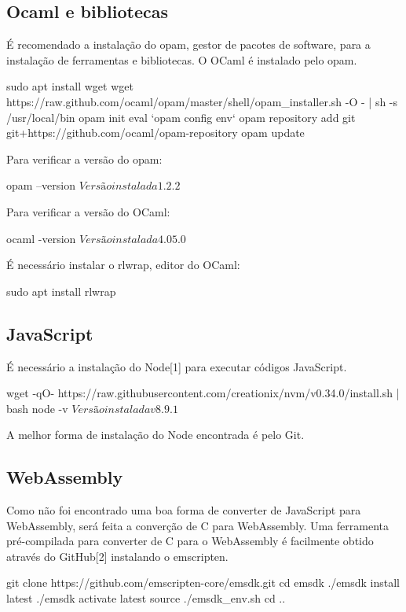 \documentclass[12pt,a4paper,twoside]{article}
\begin{document}
\subsection{Ocaml e bibliotecas}
É recomendado a instalação do opam, gestor de pacotes de software, para a instalação de ferramentas e bibliotecas. O OCaml é instalado pelo opam.
\begin{terminal}
  sudo apt install wget
  wget https://raw.github.com/ocaml/opam/master/shell/opam_installer.sh -O - | sh -s /usr/local/bin
  opam init
  eval `opam config env`
  opam repository add git git+https://github.com/ocaml/opam-repository
  opam update
 \end{terminal}
Para verificar a versão do opam:
\begin{terminal}
    opam --version  
    $ Versão instalada 1.2.2 $
\end{terminal}
Para verificar a versão do OCaml:
\begin{terminal}
    ocaml -version  
    $ Versão instalada 4.05.0 $
\end{terminal}
É necessário instalar o rlwrap, editor do OCaml:
\begin{terminal}
    sudo apt install rlwrap
\end{terminal}

\subsection{JavaScript}
É necessário a instalação do Node[1] para executar códigos JavaScript.
\begin{terminal}
    wget -qO- https://raw.githubusercontent.com/creationix/nvm/v0.34.0/install.sh | bash
    node -v
    $ Versão instalada v8.9.1 $
\end{terminal}
A melhor forma de instalação do Node encontrada é pelo Git.

\subsection{WebAssembly}
Como não foi encontrado uma boa forma de converter de JavaScript para WebAssembly, será feita a converção de C para WebAssembly.
\newline
Uma  ferramenta pré-compilada para converter de C para o WebAssembly é facilmente obtido através do GitHub[2] instalando o emscripten.
\begin{terminal}
    git clone https://github.com/emscripten-core/emsdk.git
    cd emsdk
    ./emsdk install latest
    ./emsdk activate latest
    source ./emsdk_env.sh
    cd ..
\end{terminal}
\end{document}
